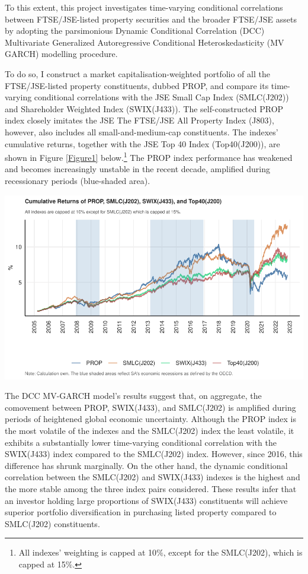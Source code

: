 \documentclass[11pt,preprint, authoryear]{elsarticle}
\let\origfigure\figure
\let\endorigfigure\endfigure
\renewenvironment{figure}[1][2] {
    \expandafter\origfigure\expandafter[H]
} {
    \endorigfigure
}
\numberwithin{equation}{section}
\numberwithin{figure}{section}
\numberwithin{table}{section}
\let\rmarkdownfootnote\footnote%
\def\footnote{\protect\rmarkdownfootnote}
\begin{document}
To this extent, this project investigates time-varying conditional
correlations between FTSE/JSE-listed property securities and the broader
FTSE/JSE assets by adopting the parsimonious Dynamic Conditional
Correlation (DCC) Multivariate Generalized Autoregressive Conditional
Heteroskedasticity (MV GARCH) modelling procedure.

To do so, I construct a market capitalisation-weighted portfolio of all
the FTSE/JSE-listed property constituents, dubbed PROP, and compare its
time-varying conditional correlations with the JSE Small Cap Index
(SMLC(J202)) and Shareholder Weighted Index (SWIX(J433)). The
self-constructed PROP index closely imitates the JSE The FTSE/JSE All
Property Index (J803), however, also includes all small-and-medium-cap
constituents. The indexes' cumulative returns, together with the JSE Top
40 Index (Top40(J200)), are shown in Figure \ref{Figure1}
below.\footnote{All indexes' weighting is capped at 10\(\%\), except for
  the SMLC(J202), which is capped at 15\(\%\).} The PROP index
performance has weakened and becomes increasingly unstable in the recent
decade, amplified during recessionary periods (blue-shaded area).

\begin{figure}[H]

{\centering \includegraphics{19025831_files/figure-latex/Figure1-1} 

}

\caption{Cumulative Returns \label{Figure1}}\label{fig:Figure1}
\end{figure}

The DCC MV-GARCH model's results suggest that, on aggregate, the
comovement between PROP, SWIX(J433), and SMLC(J202) is amplified during
periods of heightened global economic uncertainty. Although the PROP
index is the most volatile of the indexes and the SMLC(J202) index the
least volatile, it exhibits a substantially lower time-varying
conditional correlation with the SWIX(J433) index compared to the
SMLC(J202) index. However, since 2016, this difference has shrunk
marginally. On the other hand, the dynamic conditional correlation
between the SMLC(J202) and SWIX(J433) indexes is the highest and the
more stable among the three index pairs considered. These results infer
that an investor holding large proportions of SWIX(J433) constituents
will achieve superior portfolio diversification in purchasing listed
property compared to SMLC(J202) constituents.
\end{document}
